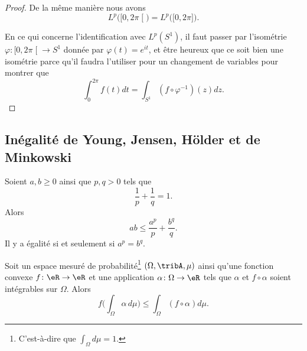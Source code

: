 \begin{proof}
	De la même manière nous avons
	\begin{equation}
		L^p\big( \mathopen[ 0 , 2\pi \mathclose[ \big)=L^p\big( \mathopen[ 0 , 2\pi \mathclose] \big).
	\end{equation}

	En ce qui concerne l'identification avec \( L^p(S^1)\), il faut passer par l'isométrie \( \varphi\colon \mathopen[ 0 , 2\pi \mathclose[\to S^1\) donnée par \( \varphi(t)= e^{it}\), et être heureux que ce soit bien une isométrie parce qu'il faudra l'utiliser pour un changement de variables pour montrer que
	\begin{equation}
		\int_0^{2\pi}f(t)dt=\int_{S^1}(f\circ\varphi^{-1})(z)dz.
	\end{equation}
\end{proof}

\subsection{Inégalité de Young, Jensen, Hölder et de Minkowski}

\begin{proposition}     \label{PROPooCQUBooCvtMSi}
	Soient \( a,b\geq 0\) ainsi que \( p,q>0\) tels que
	\begin{equation}
		\frac{1}{ p }+\frac{1}{ q }=1.
	\end{equation}
	Alors
	\begin{equation}
		ab\leq \frac{ a^p }{ p }+\frac{ b^q }{ q }.
	\end{equation}
	Il y a égalité si et seulement si \( a^p=b^q\).
\end{proposition}

\begin{proposition} \label{PropXISooBxdaLk}
	Soit un espace mesuré de probabilité\footnote{C'est-à-dire que \( \int_{\Omega}d\mu=1\).} \( (\Omega,\tribA,\mu)\) ainsi qu'une fonction convexe \( f\colon \eR\to \eR\) et une application \( \alpha\colon \Omega\to \eR\) tels que \( \alpha\) et \( f\circ \alpha\) soient intégrables sur \( \Omega\). Alors
	\begin{equation}
		f\Big( \int_{\Omega}\alpha\,d\mu \Big)\leq \int_{\Omega}(f\circ\alpha) d\mu.
	\end{equation}
\end{proposition}

